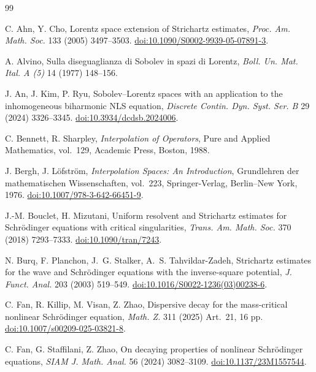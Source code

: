 \documentclass[preprint,12pt]{elsarticle}
\numberwithin{equation}{section}
\theoremstyle{definition}
\theoremstyle{remark}
\begin{document}
\setlength{\bibsep}{6pt plus 1pt minus 1pt}
\begin{thebibliography}{99}

C. Ahn, Y. Cho,
Lorentz space extension of Strichartz estimates,
\emph{Proc. Am. Math. Soc.} 133 (2005) 3497--3503.
\href{https://doi.org/10.1090/S0002-9939-05-07891-3}
{doi:10.1090/S0002-9939-05-07891-3}.

A. Alvino,
Sulla diseguaglianza di Sobolev in spazi di Lorentz,
\emph{Boll. Un. Mat. Ital. A (5)} 14 (1977) 148--156.

J. An, J. Kim, P. Ryu,
Sobolev--Lorentz spaces with an application to the inhomogeneous
biharmonic NLS equation,
\emph{Discrete Contin. Dyn. Syst. Ser. B} 29 (2024) 3326--3345.
\href{https://doi.org/10.3934/dcdsb.2024006}
{doi:10.3934/dcdsb.2024006}.

C. Bennett, R. Sharpley,
\emph{Interpolation of Operators},
Pure and Applied Mathematics, vol.~129,
Academic Press, Boston, 1988.

J. Bergh, J. L\"ofstr\"om,
\emph{Interpolation Spaces: An Introduction},
Grundlehren der mathematischen Wissenschaften, vol.~223,
Springer-Verlag, Berlin--New York, 1976.
\href{https://doi.org/10.1007/978-3-642-66451-9}
{doi:10.1007/978-3-642-66451-9}.

J.-M. Bouclet, H. Mizutani,
Uniform resolvent and Strichartz estimates for Schr\"odinger
equations with critical singularities,
\emph{Trans. Am. Math. Soc.} 370 (2018) 7293--7333.
\href{https://doi.org/10.1090/tran/7243}
{doi:10.1090/tran/7243}.

N. Burq, F. Planchon, J.~G. Stalker, A.~S. Tahvildar-Zadeh,
Strichartz estimates for the wave and Schr\"odinger equations with the
inverse-square potential,
\emph{J. Funct. Anal.} 203 (2003) 519--549.
\href{https://doi.org/10.1016/S0022-1236(03)00238-6}
{doi:10.1016/S0022-1236(03)00238-6}.

C. Fan, R. Killip, M. Visan, Z. Zhao,
Dispersive decay for the mass-critical nonlinear Schr\"odinger
equation,
\emph{Math. Z.} 311 (2025) Art.~21, 16 pp.
\href{https://doi.org/10.1007/s00209-025-03821-8}
{doi:10.1007/s00209-025-03821-8}.

C. Fan, G. Staffilani, Z. Zhao,
On decaying properties of nonlinear Schr\"odinger equations,
\emph{SIAM J. Math. Anal.} 56 (2024) 3082--3109.
\href{https://doi.org/10.1137/23M1557544}
{doi:10.1137/23M1557544}.


\end{thebibliography}
\end{document}
